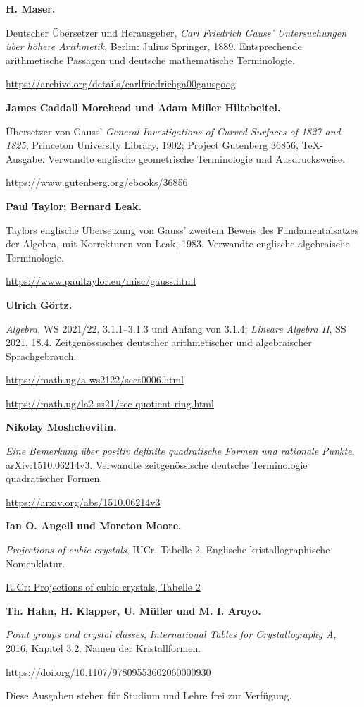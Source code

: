 \par\medskip\noindent\textbf{H. Maser.}\par\nobreak\smallskip\noindent Deutscher Übersetzer und Herausgeber, \emph{Carl Friedrich Gauss' Untersuchungen über höhere Arithmetik}, Berlin: Julius Springer, 1889. Entsprechende arithmetische Passagen und deutsche mathematische Terminologie.\par
\url{https://archive.org/details/carlfriedrichga00gausgoog}
\par\medskip\noindent\textbf{James Caddall Morehead und Adam Miller Hiltebeitel.}\par\nobreak\smallskip\noindent Übersetzer von Gauss' \emph{General Investigations of Curved Surfaces of 1827 and 1825}, Princeton University Library, 1902; Project Gutenberg 36856, TeX-Ausgabe. Verwandte englische geometrische Terminologie und Ausdrucksweise.\par
\url{https://www.gutenberg.org/ebooks/36856}
\par\medskip\noindent\textbf{Paul Taylor; Bernard Leak.}\par\nobreak\smallskip\noindent Taylors englische Übersetzung von Gauss' zweitem Beweis des Fundamentalsatzes der Algebra, mit Korrekturen von Leak, 1983. Verwandte englische algebraische Terminologie.\par
\url{https://www.paultaylor.eu/misc/gauss.html}
\par\medskip\noindent\textbf{Ulrich Görtz.}\par\nobreak\smallskip\noindent \emph{Algebra}, WS 2021/22, 3.1.1–3.1.3 und Anfang von 3.1.4; \emph{Lineare Algebra II}, SS 2021, 18.4. Zeitgenössischer deutscher arithmetischer und algebraischer Sprachgebrauch.\par
\url{https://math.ug/a-ws2122/sect0006.html}\par
\url{https://math.ug/la2-ss21/sec-quotient-ring.html}
\par\medskip\noindent\textbf{Nikolay Moshchevitin.}\par\nobreak\smallskip\noindent \emph{Eine Bemerkung über positiv definite quadratische Formen und rationale Punkte}, arXiv:1510.06214v3. Verwandte zeitgenössische deutsche Terminologie quadratischer Formen.\par
\url{https://arxiv.org/abs/1510.06214v3}
\par\medskip\noindent\textbf{Ian O. Angell und Moreton Moore.}\par\nobreak\smallskip\noindent \emph{Projections of cubic crystals}, IUCr, Tabelle 2. Englische kristallographische Nomenklatur.\par
\href{https://www.iucr.org/what-we-do/education/pamphlets/projections-of-cubic-crystals}{IUCr: Projections of cubic crystals, Tabelle 2}
\par\medskip\noindent\textbf{Th. Hahn, H. Klapper, U. Müller und M. I. Aroyo.}\par\nobreak\smallskip\noindent \emph{Point groups and crystal classes}, \emph{International Tables for Crystallography A}, 2016, Kapitel 3.2. Namen der Kristallformen.\par
\url{https://doi.org/10.1107/97809553602060000930}


\par Diese Ausgaben stehen für Studium und Lehre frei zur Verfügung.\par

\clearpage\endgroup\clearpage
\setcounter{page}{\the\SavedTranslationPage}
\hypersetup{pageanchor=true}
